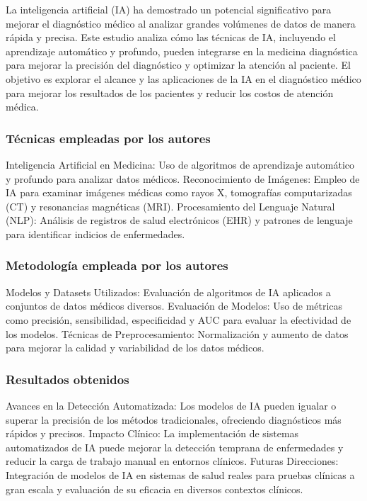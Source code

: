 La inteligencia artificial (IA) ha demostrado un potencial significativo para mejorar el diagnóstico médico al analizar grandes volúmenes de datos de manera rápida y precisa. Este estudio analiza cómo las técnicas de IA, incluyendo el aprendizaje automático y profundo, pueden integrarse en la medicina diagnóstica para mejorar la precisión del diagnóstico y optimizar la atención al paciente. El objetivo es explorar el alcance y las aplicaciones de la IA en el diagnóstico médico para mejorar los resultados de los pacientes y reducir los costos de atención médica.

\subsubsection{Técnicas empleadas por los autores}

Inteligencia Artificial en Medicina: Uso de algoritmos de aprendizaje automático y profundo para analizar datos médicos.
Reconocimiento de Imágenes: Empleo de IA para examinar imágenes médicas como rayos X, tomografías computarizadas (CT) y resonancias magnéticas (MRI).
Procesamiento del Lenguaje Natural (NLP): Análisis de registros de salud electrónicos (EHR) y patrones de lenguaje para identificar indicios de enfermedades.

\subsubsection{Metodología empleada por los autores}

Modelos y Datasets Utilizados: Evaluación de algoritmos de IA aplicados a conjuntos de datos médicos diversos.
Evaluación de Modelos: Uso de métricas como precisión, sensibilidad, especificidad y AUC para evaluar la efectividad de los modelos.
Técnicas de Preprocesamiento: Normalización y aumento de datos para mejorar la calidad y variabilidad de los datos médicos.

\subsubsection{Resultados obtenidos}

Avances en la Detección Automatizada: Los modelos de IA pueden igualar o superar la precisión de los métodos tradicionales, ofreciendo diagnósticos más rápidos y precisos.
Impacto Clínico: La implementación de sistemas automatizados de IA puede mejorar la detección temprana de enfermedades y reducir la carga de trabajo manual en entornos clínicos.
Futuras Direcciones: Integración de modelos de IA en sistemas de salud reales para pruebas clínicas a gran escala y evaluación de su eficacia en diversos contextos clínicos.

 